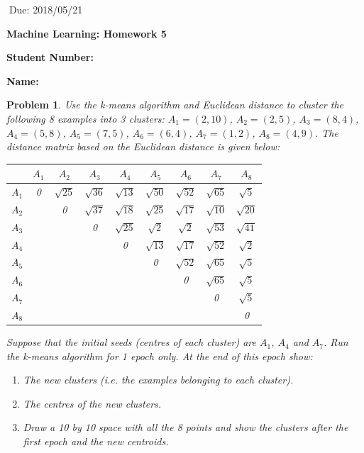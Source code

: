 \documentclass[12pt]{article}
\newtheorem{hw}{Problem}
\begin{document}
	
	$\;$\hfill Due: 2018/05/21
	
	\begin{center}
		{\LARGE\bf Machine Learning: Homework 5}
	\end{center}
	
	\textbf{Student Number:}
	
	\textbf{Name:}
	
    
\begin{hw}\rm
Use the  k-means algorithm and Euclidean distance to cluster the following 8 examples into 3 clusters: $A_1 = (2,10)$, $A_2 = (2,5)$, $A_3 = (8,4)$, $A_4 = (5,8)$, $A_5 = (7,5)$, $A_6 = (6,4)$, $A_7 = (1,2)$, $A_8 = (4,9)$. The distance matrix based on the Euclidean distance is given below:
\begin{table}
\begin{center}
\begin{tabular}{ |c|c|c|c|c|c|c|c|c| } 
 \hline
 & $A_1$ & $A_2$ & $A_3$ & $A_4$ & $A_5$ & $A_6$ & $A_7$ & $A_8$\\ 
  \hline
 $A_1$ & 0 & $\sqrt{25}$ & $\sqrt{36}$ & $\sqrt{13}$ & $\sqrt{50}$ & $\sqrt{52}$ & $\sqrt{65}$ & $\sqrt{5}$\\ 
  \hline
 $A_2$ & & 0 & $\sqrt{37}$ & $\sqrt{18}$ & $\sqrt{25}$ & $\sqrt{17}$ & $\sqrt{10}$ & $\sqrt{20}$\\ 
  \hline 
 $A_3$ & & & 0 & $\sqrt{25}$ & $\sqrt{2}$ & $\sqrt{2}$ & $\sqrt{53}$ & $\sqrt{41}$\\ 
  \hline
 $A_4$ & & & & 0 & $\sqrt{13}$ & $\sqrt{17}$ & $\sqrt{52}$ & $\sqrt{2}$\\
  \hline 
 $A_5$ & & & & & 0 & $\sqrt{52}$ & $\sqrt{65}$ & $\sqrt{5}$\\ 
  \hline
 $A_6$ & & & & & & 0 & $\sqrt{65}$ & $\sqrt{5}$ \\ 
  \hline
 $A_7$ & & & & & & & 0 & $\sqrt{5}$ \\ 
  \hline
 $A_8$ & & & & & & & & 0 \\ 
 \hline
\end{tabular}
\end{center}
\end{table}
Suppose that the initial seeds (centres of each cluster) are $A_1$, $A_4$ and $A_7$. Run the k-means algorithm for
1 epoch only. At the end of this epoch show:
\begin{enumerate}[label=(\alph*)]
\item The new clusters (i.e. the examples belonging to each cluster).
\item The centres of the new clusters.
\item Draw a 10 by 10 space with all the 8 points and show the clusters after the first epoch and the new
centroids.
\end{enumerate}

\end{hw}   
\end{document}

